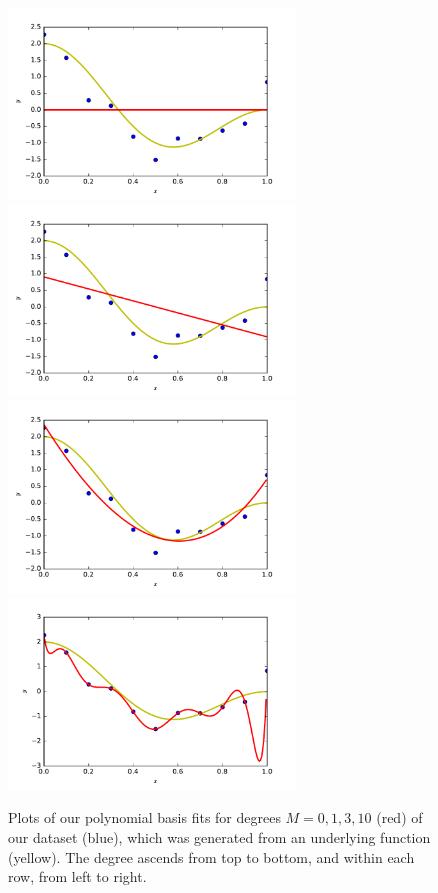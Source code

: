 \documentclass{article}
\begin{document}
\begin{multicols}{2}
\begin{figure}
   \centering
   \includegraphics[width=3in]{img/2-1_degree0.pdf}
   \includegraphics[width=3in]{img/2-1_degree1.pdf}
   \includegraphics[width=3in]{img/2-1_degree3.pdf}
   \includegraphics[width=3in]{img/2-1_degree10.pdf}
   \caption{Plots of our polynomial basis fits for degrees $M=0,1,3,10$ (red) of our dataset (blue), which was generated from an underlying function (yellow).
   The degree ascends from top to bottom, and within each row, from left to right.}
   \label{fig:2.1-polybasis}
\end{figure}


\end{multicols}
\end{document}
